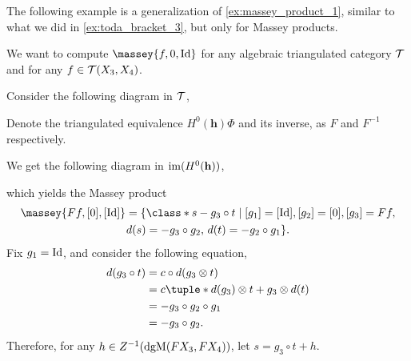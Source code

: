 The following example is a generalization of \autoref{ex:massey_product_1}, similar to what we did in \autoref{ex:toda_bracket_3}, but only for Massey products.

\begin{example}
    We want to compute \( \massey{f, 0, \Id} \) for any algebraic triangulated category \( {\mathcal{T}} \) and for any \( f \in {\mathcal{T}}(X_3, X_4) \).

    Consider the following diagram in \( {\mathcal{T}} \),
    \begin{center}
    \end{center}

    Denote the triangulated equivalence \( H^0(\mathbf{h}) \Phi \) and its inverse, as \( F \) and \( F^{-1} \) respectively.

    We get the following diagram in \( \operatorname{im}(H^0(\mathbf{h})) \),
    \begin{center}
    \end{center}
    which yields the Massey product
    \begin{multline*}
        \massey{F f, [0], [\Id]} =
        \{
            \class*{
                s - g_3 \circ t
            }
            \mid [g_1] = [\Id], [g_2] = [0], [g_3] = F f, \\
            d(s) = - g_3 \circ g_2, \,
            d(t) = - g_2 \circ g_1
        \}.
    \end{multline*}
    Fix \( g_1 = \operatorname{Id} \), and consider the following equation,
    \begin{align*}
        d(g_3 \circ t) &= c \circ d (g_3 \otimes t) \\
        &= c \tuple*{ d(g_3) \otimes t + g_3 \otimes d(t) } \\
        &= - g_3 \circ g_2 \circ g_1 \\
        &= - g_3 \circ g_2.
    \end{align*}
    Therefore, for any \( h \in Z^{-1}(\operatorname{dgM}(F X_3, F X_4)) \), let \( s = g_3 \circ t + h \).


\end{example}
